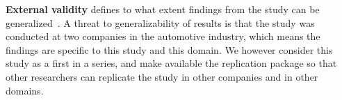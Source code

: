 \documentclass[sigconf,review, anonymous]{acmart}
\begin{document}
\textbf{External validity} defines to what extent findings from the study can be generalized~\cite{Creswell2003}. A threat to generalizability of results is that the study was conducted at two companies in the automotive industry, which means the findings are specific to this study and this domain. We however consider this study as a first in a series, and make available the replication package so that other researchers can replicate the study in other companies and in other domains.



%


\balance



\end{document}
